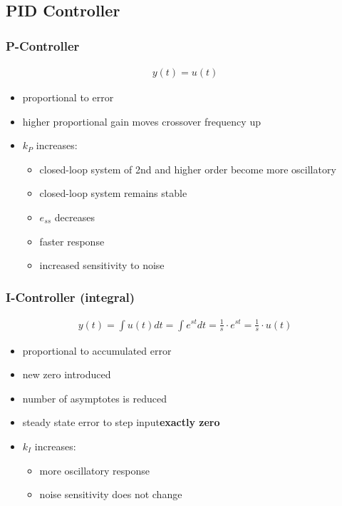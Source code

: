 \subsection{PID Controller}
    \subsubsection{P-Controller}
            \begin{align*}
                y(t) = u(t)
            \end{align*}
        \begin{itemize}
            \item proportional to error
            \item higher proportional gain moves crossover frequency up
            \item $k_P$ increases:
            \begin{itemize}
                \item closed-loop system of 2nd and higher order become more oscillatory
                \item closed-loop system remains stable
                \item $e_{ss}$ decreases
                \item faster response
                \item increased sensitivity to noise
            \end{itemize}
        \end{itemize}

    \subsubsection{I-Controller (integral)}
            \begin{align*}
                y(t) = \int u(t) dt = \int e^{st} dt = \frac{1}{s} \cdot e^{st} = \frac{1}{s} \cdot u(t)
            \end{align*}
        \begin{itemize}
            \item proportional to accumulated error
            \item new zero introduced
            \item number of asymptotes is reduced
            \item steady state error to step input\textbf{exactly zero}
            \item $k_I$ increases:
            \begin{itemize}
                \item more oscillatory response
                \item noise sensitivity does not change
            \end{itemize}
        \end{itemize}


